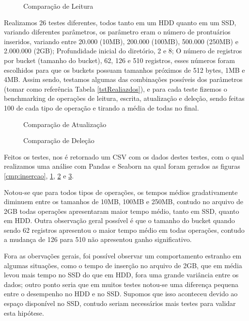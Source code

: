 \begin{figure}[htbp]
  \centering
  
  \caption{Comparação de Leitura}
  \label{cmp:leitura}
\end{figure}

Realizamos 26 testes diferentes, todos tanto em um HDD quanto em um SSD, variando diferentes parâmetros, os parâmetro eram o número de prontuários inseridos, variando entre 20.000 (10MB), 200.000 (100MB), 500.000 (250MB) e 2.000.000 (2GB); Profundidade inicial do diretório, 2 e 8; O número de registros por bucket (tamanho do bucket), 62, 126 e 510 registros, esses números foram escolhidos para que os buckets possuam tamanhos próximos de 512 bytes, 1MB e 4MB. Assim sendo, testamos algumas das combinações possíveis dos parâmetros (tomar como referência Tabela \ref{tstRealiazdos}), e para cada teste fizemos o benchmarking de operações de leitura, escrita, atualização e deleção, sendo feitas 100 de cada tipo de operação e tirando a média de todas no final.



\begin{figure}[htbp]
  \centering
  
  \caption{Comparação de Atualização}
  \label{cmp:atualizacao}
\end{figure}

\begin{figure}[htbp]
  \centering
  
  \caption{Comparação de Deleção}
  \label{cmp:delete}
\end{figure}

Feitos os testes, nos é retornado um CSV com os dados destes testes, com o qual realizamos uma análise com Pandas e Seaborn na qual foram gerados as figuras \ref{cmp:insercao}, \ref{cmp:leitura}, \ref{cmp:atualizacao} e \ref{cmp:delete}. 

Notou-se que para todos tipos de operações, os tempos médios gradativamente diminuem entre os tamanhos de 10MB, 100MB e 250MB, contudo no arquivo de 2GB todas operações apresentaram maior tempo médio, tanto em SSD, quanto em HDD. Outra observação geral possível é que o tamanho do bucket quando sendo 62 registros apresentou o maior tempo médio em todas operações, contudo a mudança de 126 para 510 não apresentou ganho significativo. 

Fora as obervações gerais, foi possível observar um comportamento estranho em algumas situações, como o tempo de inserção no arquivo de 2GB, que em média levou mais tempo no SSD do que em HDD, fora uma grande variância entre os dados; outro ponto seria que em muitos testes notou-se uma diferença pequena entre o desempenho no HDD e no SSD. Supomos que isso aconteceu devido ao espaço disponível no SSD, contudo seriam necessários mais testes para validar esta hipótese.



